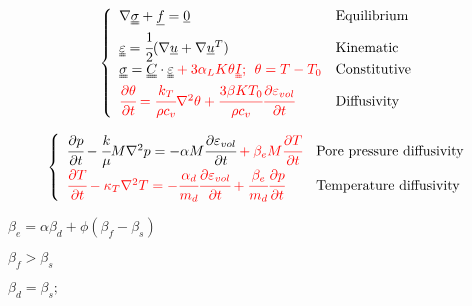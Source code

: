 \documentclass[onecolumn,11pt]{report}
\def\lthtmlcheckvsize{\ifdim\ht\sizebox<\vsize 
  \ifdim\wd\sizebox<\hsize\expandafter\hfill\fi \expandafter\vfill
  \else\expandafter\vss\fi}%
\begin{document}
{\newpage\clearpage
{}%
\begin{displaymath}\left\lbrace
\begin{array} {ll}
\nabla \uuline{\sigma} + \uline{f} = \uline{0} & \text{Equilibrium}\\
\uuline{\varepsilon} = \cfrac{1}{2} ( \nabla {\uline{u}} + \nabla {\uline{u}}^T ) & \text{Kinematic} \\
\uuline{\sigma} = \uuline{C} \cdot \uuline{\varepsilon} \color{red} + 3 \alpha_L K \theta \uuline{I}; \:\: \theta = T - T_0  & \text{Constitutive}\\
\color{red} \cfrac{\partial \theta}{\partial t} = \cfrac{k_T}{\rho c_v} \nabla^2 \theta + \cfrac{3 \beta K T_0}{\rho c_v} \cfrac{\partial \varepsilon_{vol}}{\partial t} & \text{Diffusivity}
\end{array}
\right.\end{displaymath}%
\lthtmldisplayZ
\lthtmlcheckvsize\clearpage}

{\newpage\clearpage
{}%
\begin{displaymath}\left\lbrace
\begin{array} {ll}
\cfrac{\partial p}{\partial t} - \cfrac{k}{\mu} M \nabla^2 p = - \alpha M \cfrac{\partial \varepsilon_{vol}}{\partial t} \color{red} + \beta_e M  \cfrac{\partial T}{\partial t} & \text{Pore pressure diffusivity}\\
\color{red} \cfrac{\partial T}{\partial t} - \kappa_T \nabla^2 T = -\cfrac{\alpha_d}{m_d} \cfrac{\partial \varepsilon_{vol}}{\partial t} + \cfrac{\beta_e}{m_d} \cfrac{\partial p}{\partial t} & \text{Temperature diffusivity}
\end{array}
\right.\end{displaymath}%
\lthtmldisplayZ
\lthtmlcheckvsize\clearpage}

{\newpage\clearpage
{}%
$\displaystyle \beta_e = \alpha \beta_d + \phi (\beta_f - \beta_s)$%
\lthtmlindisplaymathZ
\lthtmlcheckvsize\clearpage}

{\newpage\clearpage
{}%
$ \beta_f > \beta_s$%
\lthtmlindisplaymathZ
\lthtmlcheckvsize\clearpage}

{\newpage\clearpage
{}%
$\displaystyle \beta_d = \beta_s; \:$%
\lthtmlindisplaymathZ
\lthtmlcheckvsize\clearpage}
\end{document}
